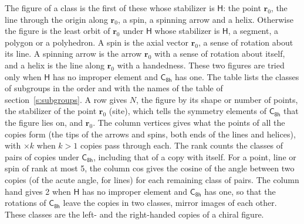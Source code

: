 \documentclass[10pt,a4paper]{article}
\numberwithin{equation}{section}
\newcommand{\grp}[1]{\mathsf{#1}}
\newcommand{\pointr}{\mathbf{r}}
\begin{document}
\leavevmode\label{n:head.figure}The figure of a class is the first of these whose stabilizer is $\grp{H}$: the point $\pointr_0$, the line through the origin along $\pointr_0$, a spin, a spinning arrow and a helix. Otherwise the figure is the least orbit of $\pointr_0$ under $\grp{H}$ whose stabilizer is $\grp{H}$, a segment, a polygon or a polyhedron. A spin is the axial vector $\pointr_0$, a sense of rotation about its line. A spinning arrow is the arrow $\pointr_0$ with a sense of rotation about itself, and a helix is the line along $\pointr_0$ with a handedness. These two figures are tried only when $\grp{H}$ has no improper element and $\grp{C_{8h}}$ has one. The table lists the classes of subgroups in the order and with the names of the table of section~\ref{s:subgroups}. \label{n:head.site}A row gives $N$, the figure by its shape or number of points, the stabilizer of the point $\pointr_0$ (site), which tells the symmetry elements of $\grp{C_{8h}}$ that the figure lies on, and $\pointr_0$. \label{n:head.vertices}The column vertices gives what the points of all the copies form (the tips of the arrows and spins, both ends of the lines and helices), with ${\times}k$ when $k > 1$ copies pass through each. \label{n:head.rank}The rank counts the classes of pairs of copies under $\grp{C_{8h}}$, including that of a copy with itself. \label{n:head.cos}For a point, line or spin of rank at most 5, the column cos gives the cosine of the angle between two copies (of the acute angle, for lines) for each remaining class of pairs. \label{n:head.hand}The column hand gives 2 when $\grp{H}$ has no improper element and $\grp{C_{8h}}$ has one, so that the rotations of $\grp{C_{8h}}$ leave the copies in two classes, mirror images of each other. These classes are the left- and the right-handed copies of a chiral figure.
\end{document}
